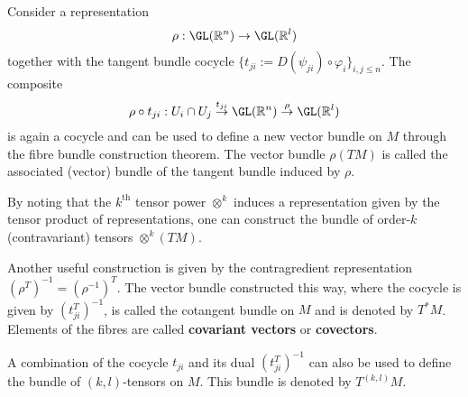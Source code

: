     \begin{construct}\label{bundle:associated_vector_bundle}
        Consider a representation \[\rho:\GL(\mathbb{R}^n)\rightarrow\GL(\mathbb{R}^l)\] together with the tangent bundle cocycle $\{t_{ji} := D(\psi_{ji})\circ\varphi_i\}_{i,j\leq n}$. The composite \[\rho\circ t_{ji}:U_i\cap U_j\overset{t_{ji}}{\rightarrow}\GL(\mathbb{R}^n)\overset{\rho}{\rightarrow}\GL(\mathbb{R}^l)\] is again a cocycle and can be used to define a new vector bundle on $M$ through the fibre bundle construction theorem. The vector bundle $\rho(TM)$ is called the associated (vector) bundle of the tangent bundle induced by $\rho$.
    \end{construct}

    \begin{example}
        By noting that the $k^{\text{th}}$ tensor power $\otimes^k$ induces a representation given by the tensor product of representations, one can construct the bundle of order-$k$ (contravariant) tensors $\otimes^k(TM)$.
    \end{example}
    \begin{example}\label{bundle:cotangent_bundle}
        Another useful construction is given by the contragredient representation $(\rho^T)^{-1}=(\rho^{-1})^T$. The vector bundle constructed this way, where the cocycle is given by $(t_{ji}^T)^{-1}$, is called the cotangent bundle on $M$ and is denoted by $T^*M$. Elements of the fibres are called \textbf{covariant vectors} or \textbf{covectors}.
    \end{example}
    \begin{notation}
        A combination of the cocycle $t_{ji}$ and its dual $(t_{ji}^T)^{-1}$ can also be used to define the bundle of $(k,l)$-tensors on $M$. This bundle is denoted by $T^{(k,l)}M$.
    \end{notation}


